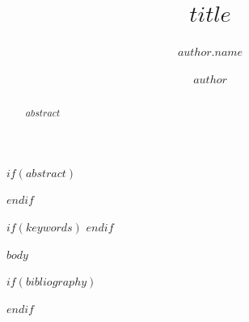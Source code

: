 \documentclass[sigconf,nonacm]{acmart}
\title{$title$}
\author{$author.name$}
\author{$author$}
\begin{document}
$if(abstract)$
\begin{abstract}
$abstract$
\end{abstract}
$endif$

$if(keywords)$
$endif$

\maketitle

$body$

$if(bibliography)$


$endif$
\end{document}
